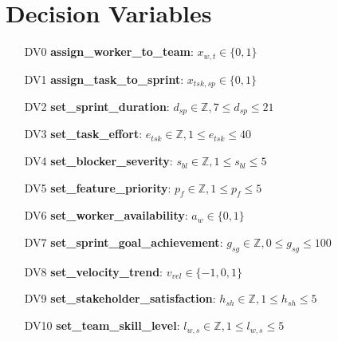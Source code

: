 \documentclass{article}
\begin{document}
\section{Decision Variables}
\begin{itemize}
    \item[DV0] \textbf{assign\_worker\_to\_team}: $x_{w,t} \in \{0,1\}$
    \item[DV1] \textbf{assign\_task\_to\_sprint}: $x_{tsk,sp} \in \{0,1\}$
    \item[DV2] \textbf{set\_sprint\_duration}: $d_{sp} \in \mathbb{Z}, 7 \leq d_{sp} \leq 21$
    \item[DV3] \textbf{set\_task\_effort}: $e_{tsk} \in \mathbb{Z}, 1 \leq e_{tsk} \leq 40$
    \item[DV4] \textbf{set\_blocker\_severity}: $s_{bl} \in \mathbb{Z}, 1 \leq s_{bl} \leq 5$
    \item[DV5] \textbf{set\_feature\_priority}: $p_{f} \in \mathbb{Z}, 1 \leq p_{f} \leq 5$
    \item[DV6] \textbf{set\_worker\_availability}: $a_{w} \in \{0,1\}$
    \item[DV7] \textbf{set\_sprint\_goal\_achievement}: $g_{sg} \in \mathbb{Z}, 0 \leq g_{sg} \leq 100$
    \item[DV8] \textbf{set\_velocity\_trend}: $v_{vel} \in \{-1,0,1\}$
    \item[DV9] \textbf{set\_stakeholder\_satisfaction}: $h_{sh} \in \mathbb{Z}, 1 \leq h_{sh} \leq 5$
    \item[DV10] \textbf{set\_team\_skill\_level}: $l_{w,s} \in \mathbb{Z}, 1 \leq l_{w,s} \leq 5$
\end{itemize}
\end{document}
